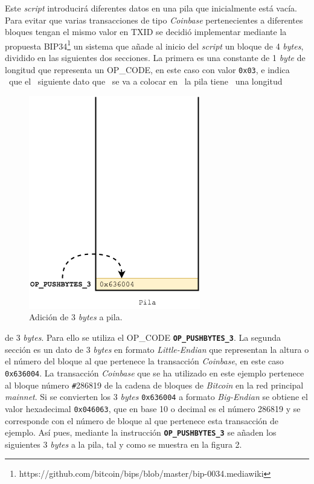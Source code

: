 \documentclass{article}
\begin{document}
    Este \textit{script} introducirá diferentes datos en una pila que inicialmente está vacía. Para evitar que varias transacciones de tipo \textit{Coinbase} pertenecientes a diferentes bloques tengan el mismo valor en TXID se decidió implementar mediante la propuesta BIP34\footnote{https://github.com/bitcoin/bips/blob/master/bip-0034.mediawiki} un sistema que añade al inicio del \textit{script} un bloque de 4 \textit{bytes}, dividido en las siguientes dos secciones. La primera es una constante de 1 \textit{byte} de longitud que representa un OP\_CODE, en este caso con valor \texttt{0x03}, e indica \ que el \ siguiente dato que \ se va a colocar en \ la pila tiene \ una longitud
    
    \vspace{1mm}
    
    \noindent
    \begin{minipage}{0.50\textwidth}
        \begin{figure}[H]
        \centering
            \includegraphics[scale=0.49]{img/Bitcoin_transactions_stack_01.png}
            \caption{Adición de 3 \textit{bytes} a pila.}
        \end{figure}
    \end{minipage}
    \hfill
    \begin{minipage}{0.50\textwidth}
        de 3 \textit{bytes}. Para ello se utiliza el OP\_CODE \textbf{\texttt{OP\_PUSHBYTES\_3}}. La segunda sección es un dato de 3 \textit{bytes} en formato \textit{Little-Endian} que representan la altura o el número del bloque al que pertenece la transacción \textit{Coinbase}, en este caso \texttt{0x636004}. La transacción \textit{Coinbase} que se ha utilizado en este ejemplo pertenece al bloque número \texttt{\#}286819 de la cadena de bloques de \textit{Bitcoin} en la red principal \textit{mainnet}. Si se convierten los 3 \textit{bytes} \texttt{0x636004} a formato \textit{Big-Endian} se obtiene el valor hexadecimal \texttt{0x046063}, que en base 10 o decimal es el número 286819 y se corresponde con el número de bloque al que pertenece esta transacción de ejemplo. Así pues, mediante la instrucción \textbf{\texttt{OP\_PUSHBYTES\_3}} se añaden los siguientes 3 \textit{bytes} a la pila, tal y como se muestra en la figura 2.
    \end{minipage}
    
\end{document}
